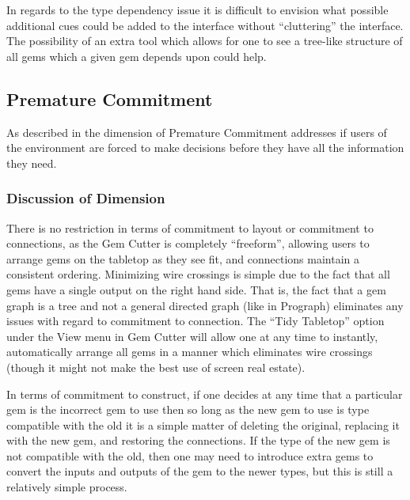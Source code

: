 In regards to the type dependency issue it is difficult to envision what possible additional cues could be added to the interface without ``cluttering'' the interface.  The possibility of an extra tool which allows for one to see a tree-like structure of all gems which a given gem depends upon could help.


\subsection{Premature Commitment}

As described in  the dimension of Premature Commitment addresses if users of the environment are forced to make decisions before they have all the information they need.

\subsubsection{Discussion of Dimension}

There is no restriction in terms of commitment to layout or commitment to connections, as the Gem Cutter is completely ``freeform'', allowing users to arrange gems on the tabletop as they see fit, and connections maintain a consistent ordering.  Minimizing wire crossings is simple due to the fact that all gems have a single output on the right hand side.  That is, the fact that a gem graph is a tree and not a general directed graph (like in Prograph) eliminates any issues with regard to commitment to connection.  The ``Tidy Tabletop'' option under the View menu in Gem Cutter will allow one at any time to instantly, automatically arrange all gems in a manner which eliminates wire crossings (though it might not make the best use of screen real estate).

In terms of commitment to construct, if one decides at any time that a particular gem is the incorrect gem to use then so long as the new gem to use is type compatible with the old it is a simple matter of deleting the original, replacing it with the new gem, and restoring the connections.  If the type of the new gem is not compatible with the old, then one may need to introduce extra gems to convert the inputs and outputs of the gem to the newer types, but this is still a relatively simple process.

